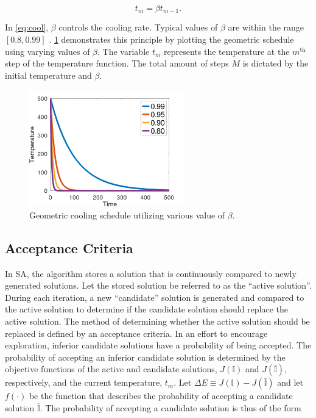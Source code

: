 \documentclass[energies,article,submit,moreauthors]{Definitions/mdpi}
\newcommand{\I}{\mathbb{I}}                 %
\begin{document}
\begin{equation}
\label{eq:cool}
t_m = \beta t_{m-1}\text{.}
\end{equation}

In \ref{eq:cool}, \(\beta\) controls the cooling rate. Typical values of \(\beta\) are within the range \([0.8, 0.99]\)
\cite{henderson-1989-theor-pract}. \ref{fig:geometric} demonstrates this principle by plotting the geometric schedule
using varying values of \(\beta\). The variable \(t_m\) represents the temperature at the \(m^{\text{th}}\) step of the temperature
function. The total amount of steps \(M\) is dictated by the initial temperature and \(\beta\).

\begin{figure}[t!]
  \centering \includegraphics[width=0.6\textwidth]{img/geometric.png}
  \caption{Geometric cooling schedule utilizing various value of $\beta$.}
  \label{fig:geometric}
\end{figure}

\subsection{Acceptance Criteria}
\label{sec:sa-acceptance}
In SA, the algorithm stores a solution that is continuously compared to newly generated solutions. Let the stored
solution be referred to as the ``active solution''. During each iteration, a new ``candidate'' solution is generated and
compared to the active solution to determine if the candidate solution should replace the active solution. The method of
determining whether the active solution should be replaced is defined by an acceptance criteria. In an effort to
encourage exploration, inferior candidate solutions have a probability of being accepted. The probability of accepting
an inferior candidate solution is determined by the objective functions of the active and candidate solutions, \(J(\I)\)
and \(J(\bar{\I})\), respectively, and the current temperature, \(t_m\). Let \(\Delta E \equiv J(\I) - J(\bar{\I})\) and let \(f(\cdot)\) be
the function that describes the probability of accepting a candidate solution \(\bar{\I}\). The probability of accepting a
candidate solution is thus of the form \cite{keller-2019-multi-objec}
\end{document}
